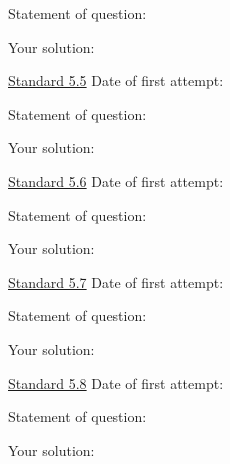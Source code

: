 \documentclass[12pt]{article}
\begin{document}
\bigskip

Statement of question:

\vspace{1in}

Your solution:

\newpage


\underline{Standard 5.5} \hspace{6cm} Date of first attempt:



\bigskip

Statement of question:

\vspace{1in}

Your solution:

\newpage


\underline{Standard 5.6} \hspace{6cm} Date of first attempt:



\bigskip

Statement of question:

\vspace{1in}

Your solution:

\newpage


\underline{Standard 5.7} \hspace{6cm} Date of first attempt:



\bigskip

Statement of question:

\vspace{1in}

Your solution:

\newpage


\underline{Standard 5.8} \hspace{6cm} Date of first attempt:



\bigskip

Statement of question:

\vspace{1in}

Your solution:
\end{document}
